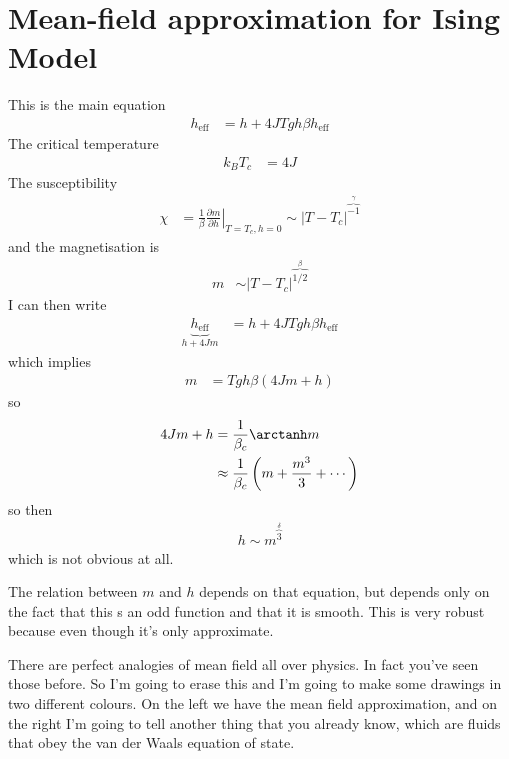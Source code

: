 \section{Mean-field approximation for Ising Model}
This is the main equation
\begin{align}
    h_{\mathrm{eff}}
    &=
    h
    +
    4J T gh \beta h_{\mathrm{eff}}
\end{align}
The critical temperature
\begin{align}
    k_B T_c &= 4J
\end{align}
The susceptibility
\begin{align}
    \chi
    &=
    \frac{1}{\beta}
    \left.\frac{\partial m}{\partial h}\right|_{T=T_c, h=0}
    \sim
    \left| T - T_c \right|^{\overbrace{-1}^{\gamma}}
\end{align}
and the magnetisation is
\begin{align}
    m &\sim
    \left| T - T_c \right|^{\overbrace{1/2}^{\beta}}
\end{align}
I can then write
\begin{align}
    \underbrace{h_{\mathrm{eff}}}_{h + 4Jm}
    &=
    h
    +
    4 J T gh \beta h_{\mathrm{eff}}
\end{align}
which implies
\begin{align}
    m &=
    Tgh \beta \left( 4J m + h \right)
\end{align}
so
\begin{align}
    4J m + h
    &=
    \frac{1}{\beta_c}
    \arctanh m\\
    &\approx
    \frac{1}{\beta_c}
    \left( 
    m
    +
    \frac{m^3}{3}
    + \cdots
    \right)
\end{align}
so then
\begin{align}
    h \sim m^{\overbrace{3}^{\delta}}
\end{align}
which is not obvious at all.

The relation between $m$ and $h$ depends on that equation,
but depends only on the fact that this s an odd function and that it is smooth.
This is very robust because even though it's only approximate.

There are perfect analogies of mean field all over physics.
In fact you've seen those before.
So I'm going to erase this and I'm going to make some drawings in two different
colours.
On the left we have the mean field approximation,
and on the right I'm going to tell another thing that you already know,
which are fluids that obey the van der Waals equation of state.

